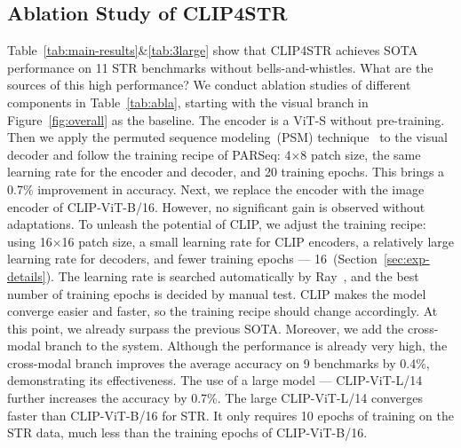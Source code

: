 \documentclass[lettersize,journal]{IEEEtran}
\begin{document}
\subsection{Ablation Study of CLIP4STR}
Table~\ref{tab:main-results}\&\ref{tab:3large} show that
CLIP4STR achieves SOTA performance on 11 STR benchmarks without bells-and-whistles.
What are the sources of this high performance?
We conduct ablation studies of different components in Table~\ref{tab:abla}, starting with the visual branch in Figure~\ref{fig:overall} as the baseline.
The encoder is a ViT-S without pre-training.
Then we apply the permuted sequence modeling~(PSM) technique~\cite{2022_parseq} to the visual decoder and follow the training recipe of PARSeq:
4$\times$8 patch size, the same learning rate for the encoder and decoder, and 20 training epochs.
This brings a 0.7\% improvement in accuracy.
Next, we replace the encoder with the image encoder of CLIP-ViT-B/16.
However, no significant gain is observed without adaptations.
To unleash the potential of CLIP, we adjust the training recipe: using 16$\times$16 patch size, a small learning rate for CLIP encoders, a relatively large learning rate for decoders, and fewer training epochs --- 16~(Section~\ref{sec:exp-details}).
The learning rate is searched automatically by Ray~\cite{moritz2018ray}, and the best number of training epochs is decided by manual test.
CLIP makes the model converge easier and faster, so the training recipe should change accordingly.
At this point, we already surpass the previous SOTA.
Moreover, we add the cross-modal branch to the system.
Although the performance is already very high, the cross-modal branch improves the average accuracy on 9 benchmarks by 0.4\%, demonstrating its effectiveness.
The use of a large model --- CLIP-ViT-L/14 further increases the accuracy by 0.7\%.
The large CLIP-ViT-L/14 converges faster than CLIP-ViT-B/16 for STR. It only requires 10 epochs of training on the STR data, much less than the training epochs of CLIP-ViT-B/16.
\end{document}
